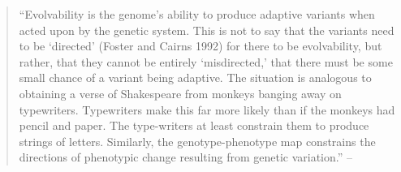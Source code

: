\begin{refsection}
\begin{quote}
``Evolvability is the genome's ability to produce adaptive variants when
acted upon by the genetic system. This is not to say that the variants
need to be `directed' (Foster and Cairns 1992) for there to be
evolvability, but rather, that they cannot be entirely `misdirected,'
that there must be some small chance of a variant being adaptive. The
situation is analogous to obtaining a verse of Shakespeare from monkeys
banging away on typewriters. Typewriters make this far more likely than
if the monkeys had pencil and paper. The type-writers at least constrain
them to produce strings of letters. Similarly, the genotype-phenotype
map constrains the directions of phenotypic change resulting from
genetic variation.'' -- \textcite{Wagner1996-ui}
\end{quote}


\end{refsection}
